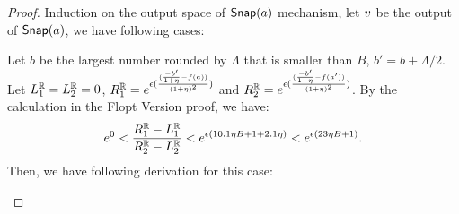 \documentclass[a4paper,11pt]{article}
\begin{document}
\begin{thm}
\end{thm}
\begin{proof}
Induction on the output space of $\mathsf{Snap}(a)$ mechanism, let $v$ be the output of $\mathsf{Snap}(a)$, we have following cases:
\begin{itemize}
%
Let $b$ be the largest number rounded by $\Lambda$ that is smaller than $B$, $b' = b + \Lambda / 2$.
%
\\
Let $L^{\mathbb{R}}_1 = L^{\mathbb{R}}_2 = 0$, 
$R^{\mathbb{R}}_1 = e^{\epsilon 
		(\frac{(\frac{-b'}{1 + \eta} - f(a))}{(1 + \eta)^2})}$
and $R^{\mathbb{R}}_2 = e^{\epsilon 
		(\frac{(\frac{-b'}{1 + \eta} - f(a'))}{(1 + \eta)^2})}$.
By the calculation in the Flopt Version proof, we have:
\[
	e^0 < \frac{R^{\mathbb{R}}_1 - L^{\mathbb{R}}_1}{R^{\mathbb{R}}_2 - L^{\mathbb{R}}_2}
	< e^{\epsilon(10.1 \eta B + 1 + 2.1\eta)} < e^{\epsilon(23 \eta B + 1)}.
\]
Then, we have following derivation for this case:


\end{itemize}
\end{proof}
\end{document}
